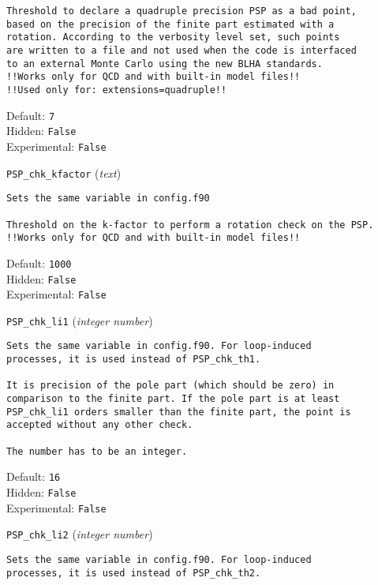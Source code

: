 \begin{basedescript}{\desclabelstyle{\pushlabel}}
\begin{verbatim}
Threshold to declare a quadruple precision PSP as a bad point,
based on the precision of the finite part estimated with a
rotation. According to the verbosity level set, such points
are written to a file and not used when the code is interfaced
to an external Monte Carlo using the new BLHA standards.
!!Works only for QCD and with built-in model files!!
!!Used only for: extensions=quadruple!!
\end{verbatim}
Default: \verb|7|
\\Hidden: \verb|False|
\\Experimental: \verb|False|
\\\item[\colorbox{gray!30}{\texttt{PSP\_chk\_kfactor}}] (\textit{text})
\begin{verbatim}
Sets the same variable in config.f90

Threshold on the k-factor to perform a rotation check on the PSP.
!!Works only for QCD and with built-in model files!!
\end{verbatim}
Default: \verb|1000|
\\Hidden: \verb|False|
\\Experimental: \verb|False|
\\\item[\colorbox{gray!30}{\texttt{PSP\_chk\_li1}}] (\textit{integer number})
\begin{verbatim}
Sets the same variable in config.f90. For loop-induced
processes, it is used instead of PSP_chk_th1.

It is precision of the pole part (which should be zero) in
comparison to the finite part. If the pole part is at least
PSP_chk_li1 orders smaller than the finite part, the point is
accepted without any other check.

The number has to be an integer.
\end{verbatim}
Default: \verb|16|
\\Hidden: \verb|False|
\\Experimental: \verb|False|
\\\item[\colorbox{gray!30}{\texttt{PSP\_chk\_li2}}] (\textit{integer number})
\begin{verbatim}
Sets the same variable in config.f90. For loop-induced
processes, it is used instead of PSP_chk_th2.


\end{verbatim}
\end{basedescript}
